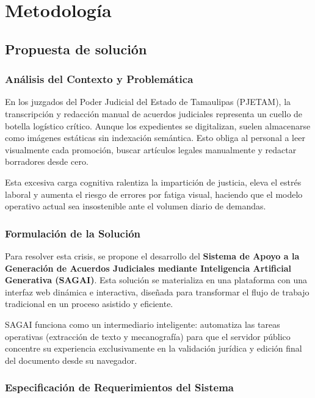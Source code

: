 \section{Metodología}
\label{ch:metodologia}

\subsection{Propuesta de solución}
\label{subsec:propuesta_solucion}

\subsubsection{Análisis del Contexto y Problemática}
\label{subsubsec:analisis_problematica}

En los juzgados del Poder Judicial del Estado de Tamaulipas (PJETAM), la transcripción y redacción manual de acuerdos judiciales representa un cuello de botella logístico crítico. Aunque los expedientes se digitalizan, suelen almacenarse como imágenes estáticas sin indexación semántica. Esto obliga al personal a leer visualmente cada promoción, buscar artículos legales manualmente y redactar borradores desde cero. 

Esta excesiva carga cognitiva ralentiza la impartición de justicia, eleva el estrés laboral y aumenta el riesgo de errores por fatiga visual, haciendo que el modelo operativo actual sea insostenible ante el volumen diario de demandas.

\subsubsection*{Formulación de la Solución}

Para resolver esta crisis, se propone el desarrollo del \textbf{Sistema de Apoyo a la Generación de Acuerdos Judiciales mediante Inteligencia Artificial Generativa (SAGAI)}. Esta solución se materializa en una plataforma con una interfaz web dinámica e interactiva, diseñada para transformar el flujo de trabajo tradicional en un proceso asistido y eficiente.

SAGAI funciona como un intermediario inteligente: automatiza las tareas operativas (extracción de texto y mecanografía) para que el servidor público concentre su experiencia exclusivamente en la validación jurídica y edición final del documento desde su navegador.

\subsubsection{Especificación de Requerimientos del Sistema}
\label{subsubsec:requerimientos}

